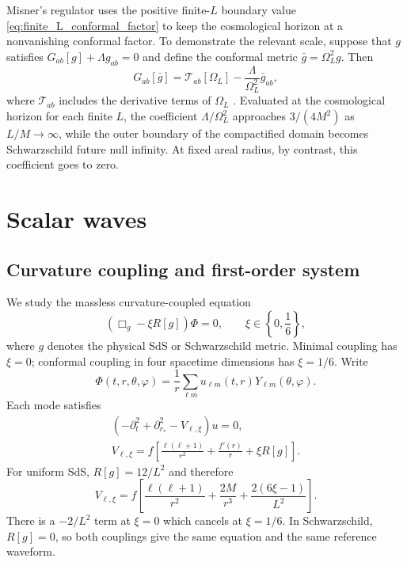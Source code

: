 \documentclass[
 aps,
 prd,
 reprint,
 superscriptaddress,
 nofootinbib,
 longbibliography
]{revtex4-2}
\begin{document}
Misner's regulator uses the positive finite-$L$ boundary value
\eqref{eq:finite_L_conformal_factor} to keep the cosmological horizon at a
nonvanishing conformal factor.  To demonstrate the relevant scale,
suppose that $g$ satisfies $G_{ab}[g]+\Lambda g_{ab}=0$ and define
the conformal metric $\bar g=\Omega_L^2g$.  Then
\begin{equation}
 G_{ab}[\bar g]=\mathcal T_{ab}[\Omega_L]
 -\frac{\Lambda}{\Omega_L^2}\bar g_{ab},
 \label{eq:conformal_einstein_scaling}
\end{equation}
where $\mathcal T_{ab}$ includes the derivative terms of $\Omega_L$
\cite{Zenginoglu:2008pw}.  Evaluated at the cosmological horizon for each
finite $L$, the coefficient $\Lambda/\Omega_L^2$ approaches $3/(4M^2)$ as
$L/M\to\infty$, while the outer boundary of the compactified domain becomes Schwarzschild
future null infinity.  At fixed areal radius, by contrast, this coefficient goes to zero.

\section{Scalar waves}
\label{sec:scalar}

\subsection{Curvature coupling and first-order system}

We study the massless curvature-coupled equation
\begin{equation}
 \left(\Box_g-\xi R[g]\right)\Phi=0,
 \qquad \xi\in\left\{0,\frac16\right\},
 \label{eq:curvature_coupled_wave}
\end{equation}
where $g$ denotes the physical SdS or Schwarzschild metric.  Minimal coupling
has $\xi=0$; conformal coupling in four spacetime dimensions has $\xi=1/6$.
Write
\begin{equation}
 \Phi(t,r,\theta,\varphi)=\frac{1}{r}
 \sum_{\ell m}u_{\ell m}(t,r)Y_{\ell m}(\theta,\varphi).
 \label{eq:scalar_decomposition}
\end{equation}
Each mode satisfies
\begin{align}
 \left(-\partial_t^2+\partial_{r_*}^2-V_{\ell,\xi}\right)u=0,
 \label{eq:wave_equation}\\
 V_{\ell,\xi}=f\left[\frac{\ell(\ell+1)}{r^2}
 +\frac{f'(r)}{r}+\xi R[g]\right].
 \label{eq:scalar_potential}
\end{align}
For uniform SdS, $R[g]=12/L^2$ and therefore
\begin{equation}
 V_{\ell,\xi}=f\left[\frac{\ell(\ell+1)}{r^2}
 +\frac{2M}{r^3}+\frac{2(6\xi-1)}{L^2}\right].
 \label{eq:uniform_coupled_potential}
\end{equation}
There is a $-2/L^2$ term at $\xi=0$ which cancels at $\xi=1/6$. In Schwarzschild, $R[g]=0$, so both couplings give the same equation and the
same reference waveform.
\end{document}
